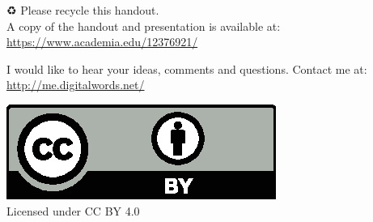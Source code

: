 \vfill


\begin{center}
\begin{extra}
	{♻} Please recycle this handout.\\A copy of the handout and presentation is available at:\\
	\url{https://www.academia.edu/12376921/}

	I would like to hear your ideas, comments and questions. Contact me at:\\
	\url{http://me.digitalwords.net/}

	\includegraphics[width=0.20\linewidth]{../cc-by.eps}\\
	Licensed under CC BY 4.0
\end{extra}
\end{center}
